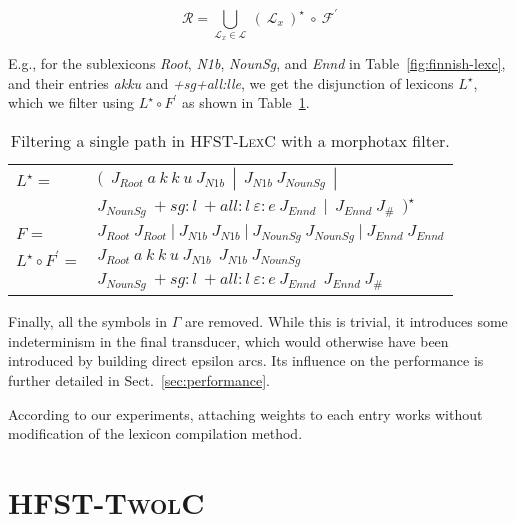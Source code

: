 \documentclass[postprint]{flammie}
\begin{document}
\begin{equation}
  \label{eqn5}
  \mathcal{R} = \bigcup_{\mathcal{L}_{x} \in \mathcal{L}}~(~\mathcal{L}_{x}~)^{\star}~\circ~\mathcal{F}^{\prime}
\end{equation}

E.g., for the sublexicons \emph{Root}, \emph{N1b}, \emph{NounSg}, and
\emph{Ennd} in Table~\ref{fig:finnish-lexc}, and their entries
\emph{akku} and \emph{+sg+all:lle}, we get the disjunction of lexicons
$L^{\star}$, which we filter using $L^{\star} \circ F^{\prime}$ as
shown in Table~\ref{filter-example}.

\begin{table}[!h]
  \center
  \begin{small}
    \begin{tabular}{l l}
      $L^{\star} =$ & $(~~J_{Root}~a~k~k~u~J_{N1b}~~|~~J_{N1b}~J_{NounSg}~~|$ \\
                    & $J_{NounSg}~\!+\!sg\!:\!l~\!+all\!:\!l~\varepsilon\!:\!e~J_{Ennd}~~|~~J_{Ennd}~J_{\#}~~)^{\star}$\\

      $F =$         & $J_{Root}~J_{Root}~|~J_{N1b}~J_{N1b}~|~J_{NounSg}~J_{NounSg}~|~J_{Ennd}~J_{Ennd}$ \\

      $L^{\star} \circ F^{\prime} =$ & $J_{Root}~a~k~k~u~J_{N1b}~~J_{N1b}~J_{NounSg}$ \\
                          & $J_{NounSg}~\!+\!sg\!:\!l~\!+\!all\!:\!l~\varepsilon\!:\!e~J_{Ennd}~~J_{Ennd}~J_{\#}$\\

    \end{tabular}
  \end{small}
  \caption{Filtering a single path in \textsc{HFST-LexC} with a
  morphotax filter.}  \label{filter-example}
\end{table}

Finally, all the symbols in $\Gamma$ are removed. While this is
trivial, it introduces some indeterminism in the final transducer,
which would otherwise have been introduced by building direct epsilon
arcs. Its influence on the performance is further detailed in
Sect.~\ref{sec:performance}.

According to our experiments, attaching weights to each entry works
without modification of the lexicon compilation method.

\section{\textsc{HFST-TwolC}}
\end{document}
